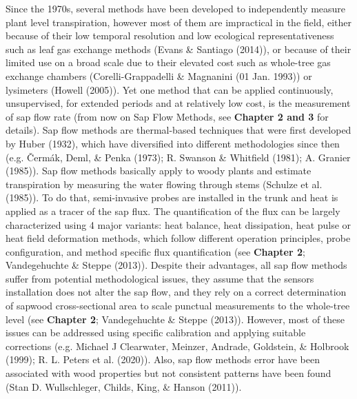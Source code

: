 \documentclass[11pt,twoside]{reedthesis}
\begin{document}
Since the 1970s, several methods have been developed to independently
measure plant level transpiration, however most of them are impractical
in the field, either because of their low temporal resolution and low
ecological representativeness such as leaf gas exchange methods (Evans
\& Santiago (2014)), or because of their limited use on a broad scale
due to their elevated cost such as whole-tree gas exchange chambers
(Corelli-Grappadelli \& Magnanini (01 Jan. 1993)) or lysimeters (Howell
(2005)). Yet one method that can be applied continuously, unsupervised,
for extended periods and at relatively low cost, is the measurement of
sap flow rate (from now on Sap Flow Methods, see \textbf{Chapter 2 and
3} for details). Sap flow methods are thermal-based techniques that were
first developed by Huber (1932), which have diversified into different
methodologies since then (e.g. Čermák, Deml, \& Penka (1973); R. Swanson
\& Whitfield (1981); A. Granier (1985)). Sap flow methods basically
apply to woody plants and estimate transpiration by measuring the water
flowing through stems (Schulze et al. (1985)). To do that, semi-invasive
probes are installed in the trunk and heat is applied as a tracer of the
sap flux. The quantification of the flux can be largely characterized
using 4 major variants: heat balance, heat dissipation, heat pulse or
heat field deformation methods, which follow different operation
principles, probe configuration, and method specific flux quantification
(see \textbf{Chapter 2}; Vandegehuchte \& Steppe (2013)). Despite their
advantages, all sap flow methods suffer from potential methodological
issues, they assume that the sensors installation does not alter the sap
flow, and they rely on a correct determination of sapwood
cross-sectional area to scale punctual measurements to the whole-tree
level (see \textbf{Chapter 2}; Vandegehuchte \& Steppe (2013)). However,
most of these issues can be addressed using specific calibration and
applying suitable corrections (e.g. Michael J Clearwater, Meinzer,
Andrade, Goldstein, \& Holbrook (1999); R. L. Peters et al. (2020)).
Also, sap flow methods error have been associated with wood properties
but not consistent patterns have been found (Stan D. Wullschleger,
Childs, King, \& Hanson (2011)).\par
\end{document}
